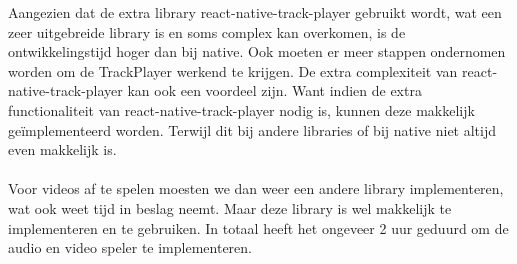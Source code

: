 Aangezien dat de extra library react-native-track-player gebruikt wordt, wat een zeer 
uitgebreide library is en soms complex kan overkomen, is de ontwikkelingstijd hoger dan bij native. 
Ook moeten er meer stappen ondernomen worden om de TrackPlayer werkend te krijgen.
De extra complexiteit van react-native-track-player kan ook een voordeel zijn. Want indien de
extra functionaliteit van react-native-track-player nodig is, kunnen deze makkelijk geïmplementeerd worden.
Terwijl dit bij andere libraries of bij native niet altijd even makkelijk is.
\\\\
Voor videos af te spelen moesten we dan weer een andere library implementeren, wat ook weet 
tijd in beslag neemt. Maar deze library is wel makkelijk te implementeren en te gebruiken.
In totaal heeft het ongeveer 2 uur geduurd om de audio en video speler te implementeren.

